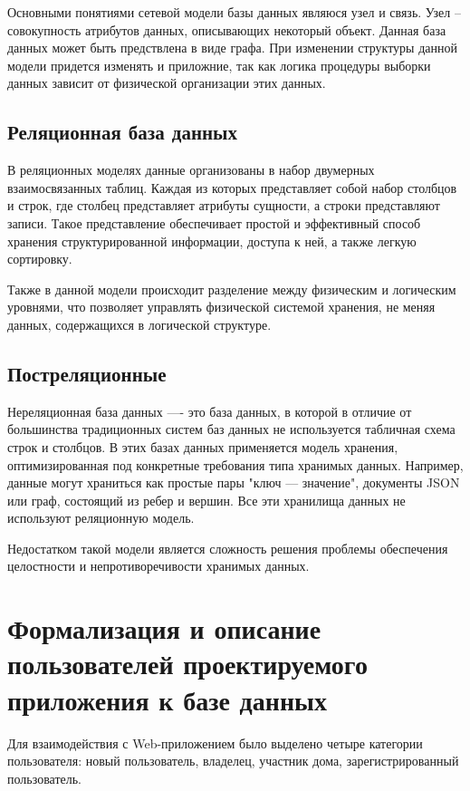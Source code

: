 Основными понятиями сетевой модели базы данных являюся узел и связь. Узел -- совокупность атрибутов данных, описывающих
некоторый объект. Данная база данных может быть предствлена в виде графа. При изменении структуры данной модели придется 
изменять и приложние, так как логика процедуры выборки данных зависит от физической организации этих данных.

\subsection{Реляционная база данных}
В реляционных моделях данные организованы в набор двумерных взаимосвязанных таблиц. 
Каждая из которых представляет собой набор столбцов и строк, где столбец представляет атрибуты сущности, 
а строки представляют записи. Такое представление обеспечивает простой и эффективный способ хранения структурированной информации, 
доступа к ней, а также легкую сортировку.

Также в данной модели происходит разделение между физическим и логическим уровнями, что 
позволяет управлять физической системой хранения, не меняя данных, содержащихся в логической структуре.


\subsection{Постреляционные}

Нереляционная база данных —- это база данных, в которой в отличие от большинства традиционных систем баз данных 
не используется табличная схема строк и столбцов. В этих базах данных применяется модель хранения, оптимизированная 
под конкретные требования типа хранимых данных. Например, данные могут храниться как простые пары "ключ — значение", 
документы JSON или граф, состоящий из ребер и вершин. Все эти хранилища данных не используют реляционную модель. 


Недостатком такой модели является сложность решения проблемы обеспечения целостности и непротиворечивости хранимых данных.


\section{Формализация и описание пользователей проектируемого приложения к базе данных}
Для взаимодействия с Web-приложением было выделено четыре категории пользователя: новый пользователь,
владелец, участник дома, зарегистрированный пользователь.

